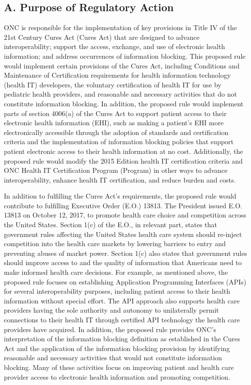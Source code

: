 \documentclass[twoside,11pt]{article}
\begin{document}
          \subsection{A. Purpose of Regulatory Action}

          ONC is responsible for the implementation of key provisions in Title IV of the 21st Century Cures Act (Cures Act) that are designed to advance interoperability; support the access, exchange, and use of electronic health information; and address occurrences of information blocking. This proposed rule would implement certain provisions of the Cures Act, including Conditions and Maintenance of Certification requirements for health information technology (health IT) developers, the voluntary certification of health IT for use by pediatric health providers, and reasonable and necessary activities that do not constitute information blocking. In addition, the proposed rule would implement parts of section 4006(a) of the Cures Act to support patient access to their electronic health information (EHI), such as making a patient's EHI more electronically accessible through the adoption of standards and certification criteria and the implementation of information blocking policies that support patient electronic access to their health information at no cost. Additionally, the proposed rule would modify the 2015 Edition health IT certification criteria and ONC Health IT Certification Program (Program) in other ways to advance interoperability, enhance health IT certification, and reduce burden and costs.


          In addition to fulfilling the Cures Act's requirements, the proposed rule would contribute to fulfilling Executive Order (E.O.) 13813. The President issued E.O. 13813 on October 12, 2017, to promote health care choice and competition across the United States. Section 1(c) of the E.O., in relevant part, states that government rules affecting the United States health care system should re-inject competition into the health care markets by lowering barriers to entry and preventing abuses of market power. Section 1(c) also states that government rules should improve access to and the quality of information that Americans need to make informed health care decisions. For example, as mentioned above, the proposed rule focuses on establishing Application Programming Interfaces (APIs) for several interoperability purposes, including patient access to their health information without special effort. The API approach also supports health care providers having the sole authority and autonomy to unilaterally permit connections to their health IT through certified API technology the health care providers have acquired. In addition, the proposed rule provides ONC's interpretation of the information blocking definition as established in the Cures Act and the application of the information blocking provision by identifying reasonable and necessary activities that would not constitute information blocking. Many of these activities focus on improving patient and health care provider access to electronic health information and promoting competition.
\end{document}

